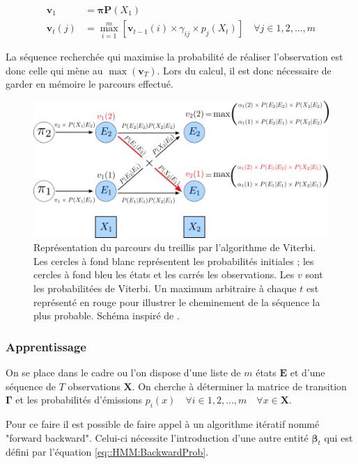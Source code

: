\documentclass[12pt]{report}
\begin{document}
\begin{align} 
\label{eq::HMM:ViterbiAlgo}
\bm{v}_1 &= \bm{\pi} \bm{P}(X_1) \\ 
\bm{v}_t(j) &= \max\limits_{i=1}^m \left[ \bm{v}_{t-1}(i) \times \gamma_{ij} \times  p_j(X_t) \right] \quad \forall j \in 1,2,...,m
\end{align}

La séquence recherchée qui maximise la probabilité de réaliser l'observation est donc celle qui mène au $\max\left(\bm{v}_T\right)$. Lors du calcul, il est donc nécessaire de garder en mémoire le parcours effectué.

\begin{figure}[ht]
	\begin{center}
		\includegraphics[width=\textwidth]{Images/Models/HMM/Viterbi.png}
		\caption{Représentation du parcours du treillis par l'algorithme de Viterbi. Les cercles à fond blanc représentent les probabilités initiales ; les cercles à fond bleu les états et les carrés les observations. Les $v$ sont les probabilitées de Viterbi. Un maximum arbitraire à chaque $t$ est représenté en rouge pour illustrer le cheminement de la séquence la plus probable. Schéma inspiré de \cite{jurafsky_speech_2017}.}
		\label{fig::HMM:ViterbiAlgo}
	\end{center}
\end{figure}

\subsubsection{Apprentissage}
\label{subsubsec:Models_HMM_Apprentissage}
On se place dans le cadre ou l'on dispose d'une liste de $m$ états $\bm{E}$ et d'une séquence de $T$ observations $\bm{X}$. On cherche à déterminer la matrice de transition $\bm{\Gamma}$ et les probabilités d'émissions $p_i(x) \quad \forall i\in 1,2,...,m \quad \forall x \in \bm{X}$.

Pour ce faire il est possible de faire appel à un algorithme itératif nommé "forward backward". Celui-ci nécessite l'introduction d'une autre entité $\bm{\beta}_t$ qui est défini par l'équation \eqref{eq::HMM:BackwardProb}.
\end{document}
